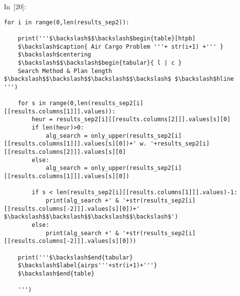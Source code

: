\documentclass{article}
\begin{document}
In~[20]:

    
\begin{verbatim}for i in range(0,len(results_sep2)):

    print('''$\backslash$$\backslash$begin{table}[htpb]
    $\backslash$caption{ Air Cargo Problem '''+ str(i+1) +''' }
    $\backslash$centering
    $\backslash$$\backslash$begin{tabular}{ l | c }
    Search Method & Plan length $\backslash$$\backslash$$\backslash$$\backslash$ $\backslash$hline ''')

    for s in range(0,len(results_sep2[i][[results.columns[1]]].values)):
        heur = results_sep2[i][[results.columns[2]]].values[s][0]
        if len(heur)>0:
            alg_search = only_upper(results_sep2[i][[results.columns[1]]].values[s][0])+' w. '+results_sep2[i][[results.columns[2]]].values[s][0]
        else:
            alg_search = only_upper(results_sep2[i][[results.columns[1]]].values[s][0])

        if s < len(results_sep2[i][[results.columns[1]]].values)-1:
            print(alg_search +' & '+str(results_sep2[i][[results.columns[-2]]].values[s][0])+' $\backslash$$\backslash$$\backslash$$\backslash$')
        else:
            print(alg_search +' & '+str(results_sep2[i][[results.columns[-2]]].values[s][0]))

    print('''$\backslash$end{tabular}
    $\backslash$label{airps'''+str(i+1)+'''}
    $\backslash$end{table}

    ''')
\end{verbatim}
\end{document}

